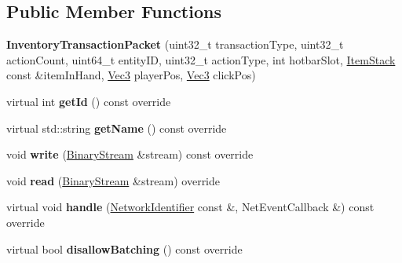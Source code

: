 \subsection*{Public Member Functions}
\begin{DoxyCompactItemize}
\item 
\mbox{\label{struct_inventory_transaction_packet_ac9def53172d966dac53422213e43edb9}} 
{\bfseries Inventory\+Transaction\+Packet} (uint32\+\_\+t transaction\+Type, uint32\+\_\+t action\+Count, uint64\+\_\+t entity\+ID, uint32\+\_\+t action\+Type, int hotbar\+Slot, \mbox{\hyperlink{struct_item_stack}{Item\+Stack}} const \&item\+In\+Hand, \mbox{\hyperlink{struct_vec3}{Vec3}} player\+Pos, \mbox{\hyperlink{struct_vec3}{Vec3}} click\+Pos)
\item 
\mbox{\label{struct_inventory_transaction_packet_a2c1c2278ce86dd24e5b7c7846267b93b}} 
virtual int {\bfseries get\+Id} () const override
\item 
\mbox{\label{struct_inventory_transaction_packet_ac0403d57e8e014ca79f5f50be31e7516}} 
virtual std\+::string {\bfseries get\+Name} () const override
\item 
\mbox{\label{struct_inventory_transaction_packet_a899dd06f6a6f476f2d14bea7e833f57f}} 
void {\bfseries write} (\mbox{\hyperlink{struct_binary_stream}{Binary\+Stream}} \&stream) const override
\item 
\mbox{\label{struct_inventory_transaction_packet_a9a5b009e9ffae96fa6f8c64970014ff1}} 
void {\bfseries read} (\mbox{\hyperlink{struct_binary_stream}{Binary\+Stream}} \&stream) override
\item 
\mbox{\label{struct_inventory_transaction_packet_af6edbc7bc4586854ee945224b6001458}} 
virtual void {\bfseries handle} (\mbox{\hyperlink{struct_network_identifier}{Network\+Identifier}} const \&, Net\+Event\+Callback \&) const override
\item 
\mbox{\label{struct_inventory_transaction_packet_a38111ed69a8c2568247f86960a2d3252}} 
virtual bool {\bfseries disallow\+Batching} () const override
\end{DoxyCompactItemize}
